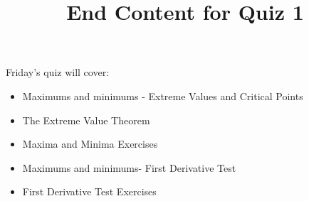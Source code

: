 \documentclass{ximera}
\title{End Content for Quiz 1}
\begin{document}
\begin{abstract}
\end{abstract}

\maketitle

\begin{sectionOutcomes}

Friday's quiz will cover:

\begin{itemize}
	\item Maximums and minimums - Extreme Values and Critical Points
	\item The Extreme Value Theorem
   	\item Maxima and Minima Exercises
    \item Maximums and minimums- First Derivative Test
	\item First Derivative Test Exercises
\end{itemize}

\end{sectionOutcomes}
\end{document}
